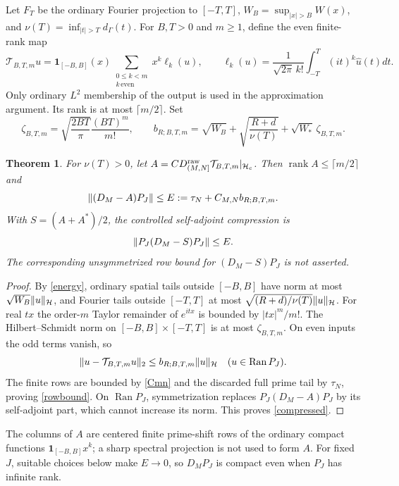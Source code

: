 \documentclass[11pt]{article}
\newtheorem{theorem}{Theorem}[section]\newtheorem{lemma}[theorem]{Lemma}\newtheorem{corollary}[theorem]{Corollary}
\begin{document}
Let $F_T$ be the ordinary Fourier projection to $[-T,T]$, $W_B=\sup_{|x|>B}W(x)$, and $\nu(T)=\inf_{|t|>T}d_\Gamma(t)$. For $B,T>0$ and $m\ge1$, define the even finite-rank map
\begin{equation}\label{Taylor}
 \mathcal T_{B,T,m}u=\mathbf1_{[-B,B]}(x)\sum_{\substack{0\le k<m\\ k\,\mathrm{even}}}x^k\ell_k(u),\qquad
 \ell_k(u)=\frac1{\sqrt{2\pi}\,k!}\int_{-T}^{T}(it)^k\widehat u(t)dt.
\end{equation}
Only ordinary $L^2$ membership of the output is used in the approximation argument. Its rank is at most $\lceil m/2\rceil$. Set
\begin{equation}\label{zeta}
 \zeta_{B,T,m}=\sqrt{\frac{2BT}{\pi}}\frac{(BT)^m}{m!},\qquad
 b_{R;B,T,m}=\sqrt{W_B}+\sqrt{\frac{R+d}{\nu(T)}}+\sqrt{W_*}\,\zeta_{B,T,m}.
\end{equation}
\begin{theorem}\label{approx}
For $\nu(T)>0$, let $A=C D_{(M,N]}^{\rm raw}\mathcal T_{B,T,m}|_{\mathcal H_c}$. Then $\operatorname{rank}A\le\lceil m/2\rceil$ and
\begin{equation}\label{rowbound}
 \lVert(D_M-A)P_J\rVert\le E:=\tau_N+C_{M,N}b_{R;B,T,m}.
\end{equation}
With $S=(A+A^*)/2$, the controlled self-adjoint compression is
\begin{equation}\label{compressed}
 \lVert P_J(D_M-S)P_J\rVert\le E.
\end{equation}
The corresponding unsymmetrized row bound for $(D_M-S)P_J$ is not asserted.
\end{theorem}
\begin{proof}
By \eqref{energy}, ordinary spatial tails outside $[-B,B]$ have norm at most $\sqrt{W_B}\lVert u\rVert_{\mathcal H}$, and Fourier tails outside $[-T,T]$ at most $\sqrt{(R+d)/\nu(T)}\lVert u\rVert_{\mathcal H}$. For real $tx$ the order-$m$ Taylor remainder of $e^{itx}$ is bounded by $|tx|^m/m!$. The Hilbert--Schmidt norm on $[-B,B]\times[-T,T]$ is at most $\zeta_{B,T,m}$. On even inputs the odd terms vanish, so
\[\lVert u-\mathcal T_{B,T,m}u\rVert_2\le b_{R;B,T,m}\lVert u\rVert_{\mathcal H}\quad(u\in\operatorname{Ran}P_J).
\]
The finite rows are bounded by \eqref{Cmn} and the discarded full prime tail by $\tau_N$, proving \eqref{rowbound}. On $\operatorname{Ran}P_J$, symmetrization replaces $P_J(D_M-A)P_J$ by its self-adjoint part, which cannot increase its norm. This proves \eqref{compressed}.
\end{proof}
The columns of $A$ are centered finite prime-shift rows of the ordinary compact functions $\mathbf1_{[-B,B]}x^k$; a sharp spectral projection is not used to form $A$. For fixed $J$, suitable choices below make $E\to0$, so $D_MP_J$ is compact even when $P_J$ has infinite rank.
\end{document}
